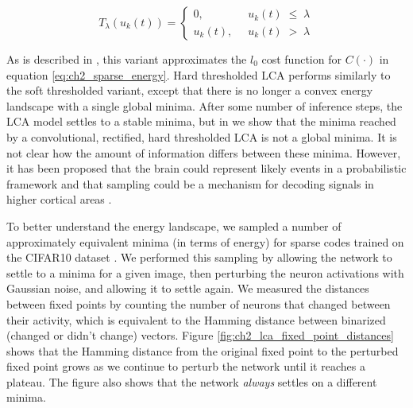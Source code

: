 \begin{equation}\label{eq:ch2_lca_hard_threshold_func}
    T_{\lambda}(u_{k}(t)) = \left\{
    \begin{aligned}
        0,\;\; &u_{k}(t)\; \leq\; \lambda \\
        u_{k}(t),\;\; &u_{k}(t)\; >\; \lambda
    \end{aligned}
    \right.
\end{equation}

As is described in \parencite{rozell2008sparse}, this variant approximates the $l_0$ cost function for $C(\cdot)$ in equation \ref{eq:ch2_sparse_energy}. Hard thresholded LCA performs similarly to the soft thresholded variant, except that there is no longer a convex energy landscape with a single global minima. After some number of inference steps, the LCA model settles to a stable minima, but in \parencite{shainin2016sampling} we show that the minima reached by a convolutional, rectified, hard thresholded LCA is not a global minima. It is not clear how the amount of information differs between these minima. However, it has been proposed that the brain could represent likely events in a probabilistic framework \cite{lee2003hierarchical} and that sampling could be a mechanism for decoding signals in higher cortical areas \cite{hoyer2003interpreting}.

To better understand the energy landscape, we sampled a number of approximately equivalent minima (in terms of energy) for sparse codes trained on the CIFAR10 dataset \parencite{krizhevsky2009learning}. We performed this sampling by allowing the network to settle to a minima for a given image, then perturbing the neuron activations with Gaussian noise, and allowing it to settle again. We measured the distances between fixed points by counting the number of neurons that changed between their activity, which is equivalent to the Hamming distance between binarized (changed or didn't change) vectors. Figure \ref{fig:ch2_lca_fixed_point_distances} shows that the Hamming distance from the original fixed point to the perturbed fixed point grows as we continue to perturb the network until it reaches a plateau. The figure also shows that the network \textit{always} settles on a different minima.

